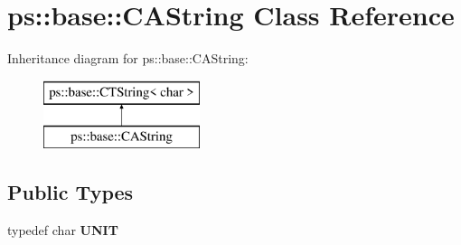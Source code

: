 \hypertarget{classps_1_1base_1_1CAString}{}\section{ps\+:\+:base\+:\+:C\+A\+String Class Reference}
\label{classps_1_1base_1_1CAString}
Inheritance diagram for ps\+:\+:base\+:\+:C\+A\+String\+:\begin{figure}[H]
\begin{center}
\leavevmode
\includegraphics[height=2.000000cm]{classps_1_1base_1_1CAString}
\end{center}
\end{figure}
\subsection*{Public Types}
\begin{DoxyCompactItemize}
\item 
\hypertarget{classps_1_1base_1_1CAString_a73ee0ab6eb0d2990f70862a566ee9cca}{}typedef char {\bfseries U\+N\+I\+T}\label{classps_1_1base_1_1CAString_a73ee0ab6eb0d2990f70862a566ee9cca}

\end{DoxyCompactItemize}
